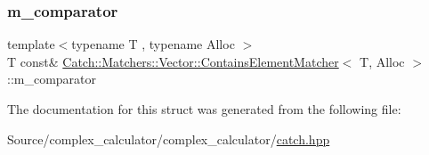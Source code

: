 \subsubsection{\texorpdfstring{m\+\_\+comparator}{m\_comparator}}
{\footnotesize\ttfamily template$<$typename T , typename Alloc $>$ \\
T const\& \mbox{\hyperlink{struct_catch_1_1_matchers_1_1_vector_1_1_contains_element_matcher}{Catch\+::\+Matchers\+::\+Vector\+::\+Contains\+Element\+Matcher}}$<$ T, Alloc $>$\+::m\+\_\+comparator}



The documentation for this struct was generated from the following file\+:\begin{DoxyCompactItemize}
\item 
Source/complex\+\_\+calculator/complex\+\_\+calculator/\mbox{\hyperlink{catch_8hpp}{catch.\+hpp}}\end{DoxyCompactItemize}
